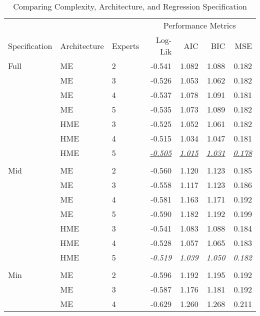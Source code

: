 \documentclass[12pt]{article}
\newcommand{\iu}[1]{\underline{\textit{#1}}}
\theoremstyle{definition}
\begin{document}
\begin{table} \centering
  \caption{Comparing Complexity, Architecture, and Regression Specification}
  \begin{threeparttable}
    {\footnotesize
    \begin{tabular}[r]{l l l r r r r}
  \cmidrule{1-7}
         &       &         &  \multicolumn{4}{c}{Performance Metrics} \\ 
   \cmidrule(l){4-7}
Specification & Architecture  & Experts & Log-Lik & AIC    & BIC    & MSE   \\ 
  \cmidrule{1-7}

Full     &  ME   &    2    & -0.541  & 1.082  & 1.088  & 0.182 \\
         &  ME   &    3    & -0.526  & 1.053  & 1.062  & 0.182 \\
         &  ME   &    4    & -0.537  & 1.078  & 1.091  & 0.181 \\
         &  ME   &    5    & -0.535  & 1.073  & 1.089  & 0.182 \\
         &  HME  &    3    & -0.525  & 1.052  & 1.061  & 0.182 \\
         &  HME  &    4    & -0.515  & 1.034  & 1.047  & 0.181 \\
         &  HME  &    5    & \iu{-0.505}  & \iu{1.015}  & \iu{1.031}  & \iu{0.178} \\
         &       &         &         &        &        &       \\
Mid      &  ME   &    2    & -0.560  & 1.120  & 1.123  & 0.185 \\
         &  ME   &    3    & -0.558  & 1.117  & 1.123  & 0.186 \\
         &  ME   &    4    & -0.581  & 1.163  & 1.171  & 0.192 \\
         &  ME   &    5    & -0.590  & 1.182  & 1.192  & 0.199 \\
         &  HME  &    3    & -0.541  & 1.083  & 1.088  & 0.184 \\
         &  HME  &    4    & -0.528  & 1.057  & 1.065  & 0.183 \\
         &  HME  &    5    & \it{-0.519}  & \it{1.039} & \it{1.050}  & \it{0.182} \\
         &       &         &         &        &        &       \\
Min      &  ME   &    2    & -0.596  & 1.192  & 1.195  & 0.192 \\
         &  ME   &    3    & -0.587  & 1.176  & 1.181  & 0.192 \\
         &  ME   &    4    & -0.629  & 1.260  & 1.268  & 0.211 \\

\end{tabular}}
\end{threeparttable}
\end{table}
\end{document}
